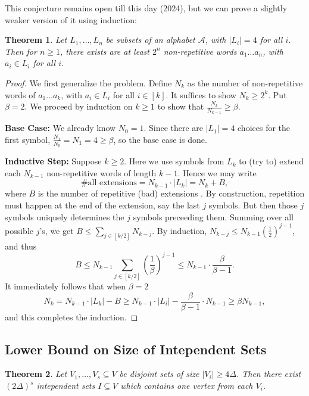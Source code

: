 \documentclass[a4paper]{article}
\newtheorem{theorem}{Theorem}[section]
\begin{document}
This conjecture remains open till this day (2024), but we can prove a slightly weaker version of it
using induction:

\begin{theorem}
  Let $L_1, \ldots, L_n$ be subsets of an alphabet $\mathcal{A}$, with $|L_i| = 4$ for all $i$. Then
  for $n \geq 1$, there exists are at least $2^n$ non-repetitive words $a_1\ldots a_n$, with $a_i
  \in L_i$ for all $i$.
\end{theorem}

\begin{proof}
  We first generalize the problem. Define $N_k$ as the number of non-repetitive words of $a_1\ldots
  a_k$, with $a_i \in L_i$ for all $i \in [k]$. It suffices to show $N_k \geq 2^k$. Put $\beta = 2$.
  We proceed by induction on $k \geq 1$ to show that $\frac{N_k}{N_{k - 1}} \geq \beta$.
  
  \textbf{Base Case:} We already know $N_0 = 1$. Since there are $|L_1| = 4$ choices for the first
  symbol, $\frac{N_1}{N_0} = N_1 = 4 \geq \beta$, so the base case is done.

  \textbf{Inductive Step:} Suppose $k \geq 2$. Here we use symbols from $L_k$ to (try to) extend
  each $N_{k - 1}$ non-repetitive words of length $k - 1$. Hence we may write
  \[
    \# \text{all extensions} = N_{k - 1} \cdot |L_k| = N_k + B,
  \]
  where $B$ is the number of repetitive (bad) extensions . By construction, repetition must happen
  at the end of the extension, say the last $j$ symbols. But then those $j$ symbols uniquely
  determines the $j$ symbols preceeding them. Summing over all possible $j$'s, we get $B \leq
  \sum_{j \in [k/2]} N_{k - j}$. By induction, $N_{k - j} \leq N_{k - 1} \left(\frac{1}{2}\right)^{j
  - 1}$, and thus
  \[
    B \leq N_{k - 1}\sum_{j \in [k/2]} \left(\frac{1}{\beta}\right)^{j - 1} \leq N_{k - 1} \cdot \frac{\beta}{\beta - 1}.
  \]
  It immediately follows that when $\beta = 2$
  \[
    N_k = N_{k - 1} \cdot |L_k| - B \geq N_{k - 1} \cdot |L_i| - \frac{\beta}{\beta - 1} \cdot N_{k - 1} \geq \beta N_{k - 1},
  \]
  and this completes the induction.
\end{proof}

\newpage

\subsection*{Lower Bound on Size of Intependent Sets}

\begin{theorem}
  Let $V_1, \ldots, V_s \subseteq V$ be disjoint sets of size $|V_{i}| \geq 4\Delta$. Then there
  exist $(2\Delta)^s$ intependent sets $I \subseteq V$ which contains one vertex from each $V_i$.
\end{theorem}
\end{document}
